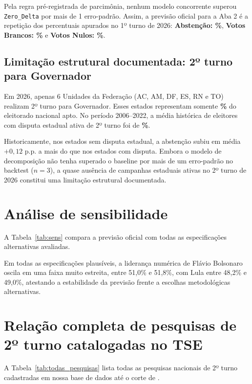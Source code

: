 \documentclass[10.5pt,a4paper]{article}
\begin{document}
Pela regra pré-registrada de parcimônia, nenhum modelo concorrente superou \texttt{Zero\_Delta} por mais de 1 erro-padrão. Assim, a previsão oficial para a Aba 2 é a repetição dos percentuais apurados no 1º turno de 2026:
\textbf{Abstenção: \pAbst\%}, \textbf{Votos Brancos: \pBrancos\%} e \textbf{Votos Nulos: \pNulos\%}.

\subsection{Limitação estrutural documentada: 2º turno para Governador}
Em 2026, apenas 6 Unidades da Federação (AC, AM, DF, ES, RN e TO) realizam 2º turno para Governador. Esses estados representam somente \textbf{\govShareVinteSeis\%} do eleitorado nacional apto. No período 2006--2022, a média histórica de eleitores com disputa estadual ativa de 2º turno foi de \textbf{\govShareHist\%}. 

Historicamente, nos estados sem disputa estadual, a abstenção subiu em média $+0{,}12$ p.p. a mais do que nos estados com disputa. Embora o modelo de decomposição não tenha superado o baseline por mais de um erro-padrão no backtest ($n=3$), a quase ausência de campanhas estaduais ativas no 2º turno de 2026 constitui uma limitação estrutural documentada.

\section{Análise de sensibilidade}

A Tabela~\ref{tab:sens} compara a previsão oficial com todas as especificações alternativas avaliadas.

\begin{table}[h]
\centering\small
\caption{Grade de sensibilidade para a eleição presidencial de 2026 (2º turno).}
\label{tab:sens}

\end{table}

Em todas as especificações plausíveis, a liderança numérica de Flávio Bolsonaro oscila em uma faixa muito estreita, entre 51,0\% e 51,8\%, com Lula entre 48,2\% e 49,0\%, atestando a estabilidade da previsão frente a escolhas metodológicas alternativas.

\newpage
\appendix
\section{Relação completa de pesquisas de 2º turno catalogadas no TSE}

A Tabela~\ref{tab:todas_pesquisas} lista todas as pesquisas nacionais de 2º turno cadastradas em nossa base de dados até o corte de \horacorte.

{\scriptsize\setlength{\tabcolsep}{3.5pt}
}
\end{document}
